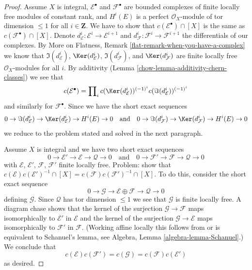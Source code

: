 \begin{proof}
\medskip\noindent
Assume $X$ is integral, $\mathcal{E}^\bullet$ and $\mathcal{F}^\bullet$
are bounded complexes of finite locally free modules of constant rank, and
$H^i(E)$ is a perfect $\mathcal{O}_X$-module of tor dimension $\leq 1$
for all $i \in \mathbf{Z}$. We have to
show that $c(\mathcal{E}^\bullet) \cap [X]$ is the same as
$c(\mathcal{F}^\bullet) \cap [X]$. Denote
$d_\mathcal{E}^i : \mathcal{E}^i \to \mathcal{E}^{i + 1}$ and
$d_\mathcal{F}^i : \mathcal{F}^i \to \mathcal{F}^{i + 1}$
the differentials of our complexes. By
More on Flatness, Remark \ref{flat-remark-when-you-have-a-complex}
we know that $\Im(d_\mathcal{E}^i)$, $\Ker(d_\mathcal{E}^i)$,
$\Im(d_\mathcal{F}^i)$, and $\Ker(d_\mathcal{F}^i)$
are finite locally free $\mathcal{O}_X$-modules for all $i$.
By additivity (Lemma \ref{chow-lemma-additivity-chern-classes}) we see that
$$
c(\mathcal{E}^\bullet) = \prod\nolimits_i
c(\Ker(d_\mathcal{E}^i))^{(-1)^i} c(\Im(d_\mathcal{E}^i))^{(-1)^i}
$$
and similarly for $\mathcal{F}^\bullet$. Since we have the
short exact sequences
$$
0 \to \Im(d_\mathcal{E}^i) \to \Ker(d_\mathcal{E}^i) \to H^i(E) \to 0
\quad\text{and}\quad
0 \to \Im(d_\mathcal{F}^i) \to \Ker(d_\mathcal{F}^i) \to H^i(E) \to 0
$$
we reduce to the problem stated and solved in the next paragraph.

\medskip\noindent
Assume $X$ is integral and we have two short exact sequences
$$
0 \to \mathcal{E}' \to \mathcal{E} \to \mathcal{Q} \to 0
\quad\text{and}\quad
0 \to \mathcal{F}' \to \mathcal{F} \to \mathcal{Q} \to 0
$$
with $\mathcal{E}$, $\mathcal{E}'$, $\mathcal{F}$, $\mathcal{F}'$
finite locally free. Problem: show that
$c(\mathcal{E})c(\mathcal{E}')^{-1} \cap [X] =
c(\mathcal{F})c(\mathcal{F}')^{-1} \cap [X]$.
To do this, consider the short exact sequence
$$
0 \to \mathcal{G} \to \mathcal{E} \oplus \mathcal{F} \to \mathcal{Q} \to 0
$$
defining $\mathcal{G}$. Since $\mathcal{Q}$ has tor dimension $\leq 1$
we see that $\mathcal{G}$ is finite locally free. A diagram chase
shows that the kernel of the surjection $\mathcal{G} \to \mathcal{F}$
maps isomorphically to $\mathcal{E}'$ in $\mathcal{E}$ and
the kernel of the surjection $\mathcal{G} \to \mathcal{E}$ maps
isomorphically to $\mathcal{F}'$ in $\mathcal{F}$. (Working affine
locally this follows from or is equivalent to Schanuel's lemma, see
Algebra, Lemma \ref{algebra-lemma-Schanuel}.)
We conclude that
$$
c(\mathcal{E})c(\mathcal{F}') = c(\mathcal{G}) =
c(\mathcal{F})c(\mathcal{E}')
$$
as desired.
\end{proof}

